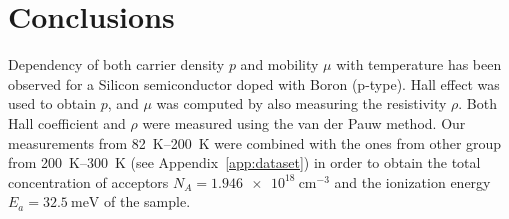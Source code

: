 \documentclass[11pt,a4paper]{article}
\begin{document}
\section{Conclusions}

Dependency of both carrier density $p$ and mobility $\mu$ with temperature has been observed for a Silicon semiconductor doped with Boron (p-type). Hall effect was used to obtain $p$, and $\mu$ was computed by also measuring the resistivity $\rho$. Both Hall coefficient and $\rho$ were measured using the van der Pauw method. Our measurements from \SIrange{82}{200}{\kelvin} were combined with the ones from other group from \SIrange{200}{300}{\kelvin} (see Appendix~\ref{app:dataset}) in order to obtain the total concentration of acceptors $N_A=\SI{1.946e18}{\centi\meter^{-3}}$ and the ionization energy $E_a=\SI{32.5}{\milli\eV}$ of the sample.


\nocite{*}
\vfill


\end{document}
